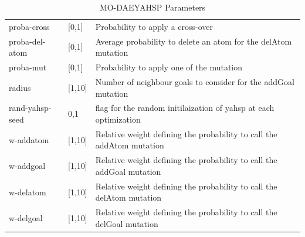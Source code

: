 \documentclass[a4paper,10pt]{article}
\begin{document}
\begin{table}
\begin{tabular}{|l|l|l|}
proba-cross	&	[0,1]	&	 Probability to apply a cross-over\\					
proba-del-atom	&	[0,1]	&	 Average probability to delete an atom for the delAtom mutation\\					
proba-mut	&	[0,1]	&	  Probability to apply one of the mutation\\					
radius	&	[1,10]	&	  Number of neighbour goals to consider for the addGoal mutation\\					
rand-yahsp-seed	&	{0,1}	&	 flag  for the random initilaization of yahsp at each optimization\\					
w-addatom	&	[1,10]	&	  Relative weight defining the probability to call the addAtom mutation\\					
w-addgoal	&	[1,10]	&	  Relative weight defining the probability to call the addGoal mutation\\					
w-delatom	&	[1,10]	&	 Relative weight defining the probability to call the delAtom mutation\\					
w-delgoal	&	[1,10]	&	 Relative weight defining the probability to call the delGoal mutation\\												
\hline				
\end{tabular}
\caption{MO-DAEYAHSP Parameters}
\label{tab:paramters}
\end{table}
\end{document}
